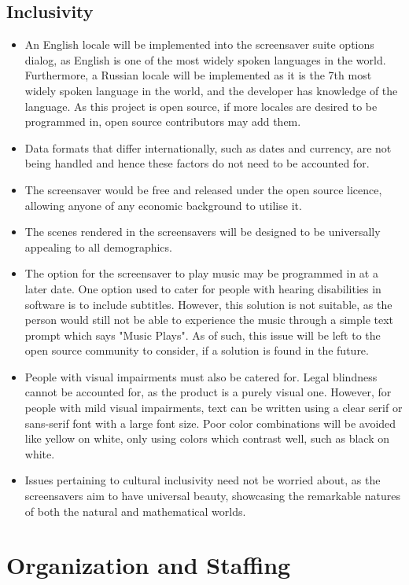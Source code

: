 \documentclass[10pt, openany]{book}
\begin{document}
\subsection{Inclusivity}
\begin{itemize}
	\item An English locale will be implemented into the screensaver
suite options dialog, as English is one of the most widely spoken languages in the world. Furthermore, a Russian locale will be implemented as it is the 7th most widely spoken language in the world, and the developer has knowledge of the language. As this project is open source, if more locales are desired to be programmed in, open source contributors may add them.
	\item Data formats that differ internationally, such as dates and currency, are not being handled and hence these factors do not need to be accounted for.
	\item The screensaver would be free and released under the open source licence, allowing anyone of any economic background to utilise it.
	\item The scenes rendered in the screensavers will be designed to be universally appealing to all demographics.	
	\item The option for the screensaver to play music may be programmed in at a later date. One option used to cater for people with hearing disabilities in software is to include subtitles. However, this solution is not suitable, as the person would still not be able to experience the music through a simple text prompt which says "Music Plays". As of such, this issue will be left to the open source community to consider, if a solution is found in the future.
	\item People with visual impairments must also be catered for. Legal blindness cannot be accounted for, as the product is a purely visual one. However, for people with mild visual impairments, text can be written using a clear serif or sans-serif font with a large font size. Poor color combinations will be avoided like yellow on white, only using colors which contrast well, such as black on white.
	\item Issues pertaining to cultural inclusivity need not be worried about, as the screensavers aim to have universal beauty, showcasing the remarkable natures of both the natural and mathematical worlds. 	
\end{itemize}	

\section{Organization and Staffing}
\end{document}
